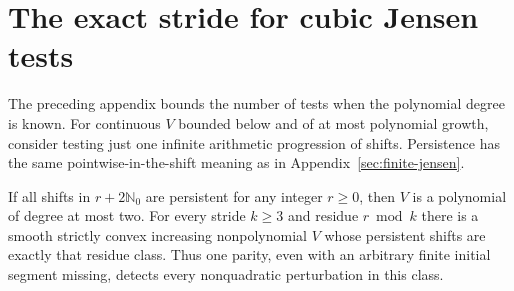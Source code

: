 \section{The exact stride for cubic Jensen tests}
The preceding appendix bounds the number of tests when the polynomial degree is known. For continuous $V$ bounded below and of at most polynomial growth, consider testing just one infinite arithmetic progression of shifts. Persistence has the same pointwise-in-the-shift meaning as in Appendix~\ref{sec:finite-jensen}.
\begin{theorem}
If all shifts in $r+2\mathbb N_0$ are persistent for any integer $r\ge0$, then $V$ is a polynomial of degree at most two. For every stride $k\ge3$ and residue $r\bmod k$ there is a smooth strictly convex increasing nonpolynomial $V$ whose persistent shifts are exactly that residue class. Thus one parity, even with an arbitrary finite initial segment missing, detects every nonquadratic perturbation in this class.
\end{theorem}
